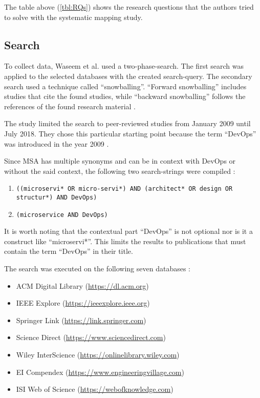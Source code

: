 The table above (\autoref{tbl:RQs}) shows the research questions that the authors
tried to solve with the systematic mapping study.

\subsection{Search}

To collect data, Waseem et al. used a two-phase-search. The first search was applied
to the selected databases with the created search-query. The secondary
search used a technique called ``snowballing''. ``Forward snowballing''
includes studies that cite the found studies, while ``backward snowballing''
follows the references of the found research material \cite{wohlin:Snowballing}.

The study limited the search to peer-reviewed studies from January 2009 until
July 2018. They chose this particular starting point because the term ``DevOps''
was introduced in the year 2009 \cite{waseem:SMSMSADevOps}.

Since MSA has multiple synonyms and can be in context with DevOps or without
the said context, the following two search-strings were compiled \cite{waseem:SMSMSADevOps}:

\begin{enumerate}
    \item \texttt{((microservi* OR micro-servi*)
              AND (architect* OR design OR structur*) AND DevOps)}
    \item \texttt{(microservice AND DevOps)}
\end{enumerate}

It is worth noting that the contextual part ``DevOps'' is not optional nor is
it a construct like ``microservi*''. This limits the results to publications
that must contain the term ``DevOps'' in their title.

The search was executed on the following seven databases \cite{waseem:SMSMSADevOps}:

\begin{itemize}
    \item ACM Digital Library (\url{https://dl.acm.org})
    \item IEEE Explore (\url{https://ieeexplore.ieee.org})
    \item Springer Link (\url{https://link.springer.com})
    \item Science Direct (\url{https://www.sciencedirect.com})
    \item Wiley InterScience (\url{https://onlinelibrary.wiley.com})
    \item EI Compendex (\url{https://www.engineeringvillage.com})
    \item ISI Web of Science (\url{https://webofknowledge.com})
\end{itemize}

